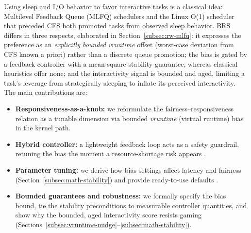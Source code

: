 Using sleep and I/O behavior to favor interactive tasks is a classical idea: Multilevel Feedback Queue (MLFQ) schedulers and the Linux O(1) scheduler that preceded CFS both promoted tasks from observed sleep behavior. BRS differs in three respects, elaborated in Section~\ref{subsec:rw-mlfq}: it expresses the preference as an \emph{explicitly bounded} \textit{vruntime} offset (worst-case deviation from CFS known a priori) rather than a discrete queue promotion; the bias is gated by a feedback controller with a mean-square stability guarantee, whereas classical heuristics offer none; and the interactivity signal is bounded and aged, limiting a task's leverage from strategically sleeping to inflate its perceived interactivity. The main contributions are:
\begin{itemize}
 \item \textbf{Responsiveness-as-a-knob:} we reformulate the fairness--responsiveness relation as a tunable dimension via bounded \textit{vruntime} (virtual runtime) bias in the kernel path.
 \item \textbf{Hybrid controller:} a lightweight feedback loop acts as a safety guardrail, retuning the bias the moment a resource-shortage risk appears \cite{5580094,7426385}.
 \item \textbf{Parameter tuning:} we derive how bias settings affect latency and fairness (Section~\ref{subsec:math-stability}) and provide ready-to-use defaults \cite{7426385}.
 \item \textbf{Bounded guarantees and robustness:} we formally specify the bias bound, tie the stability preconditions to measurable controller quantities, and show why the bounded, aged interactivity score resists gaming (Sections~\ref{subsec:vruntime-nudge}--\ref{subsec:math-stability}).
\end{itemize}
